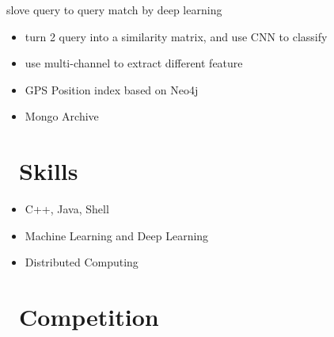 \documentclass{resume}
\begin{document}
slove query to query match by deep learning
\begin{itemize}
  \item turn 2 query into a similarity matrix, and use CNN to classify
  \item use multi-channel to extract different feature
\end{itemize}

\begin{itemize}
  \item GPS Position index based on Neo4j
  \item Mongo Archive
\end{itemize}


\section{\faCogs\ Skills}
\begin{itemize}[parsep=0.5ex]
  \item C++, Java, Shell
  \item Machine Learning and Deep Learning
  \item Distributed Computing
\end{itemize}

\section{\faTrophy\ Competition}

%
%
\end{document}
